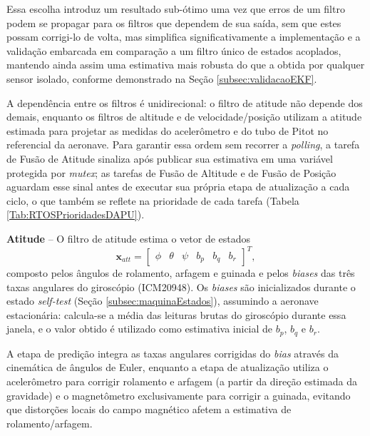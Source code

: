 Essa escolha introduz um resultado sub-ótimo uma vez que erros de um filtro podem se propagar para os filtros que dependem de sua saída, sem que estes possam corrigi-lo de volta, mas simplifica significativamente a implementação e a validação embarcada em comparação a um filtro único de estados acoplados, mantendo ainda assim uma estimativa mais robusta do que a obtida por qualquer sensor isolado, conforme demonstrado na Seção \ref{subsec:validacaoEKF}.

A dependência entre os filtros é unidirecional: o filtro de atitude não depende dos demais, enquanto os filtros de altitude e de velocidade/posição utilizam a atitude estimada para projetar as medidas do acelerômetro e do tubo de Pitot no referencial da aeronave. Para garantir essa ordem sem recorrer a \textit{polling}, a tarefa de Fusão de Atitude sinaliza após publicar sua estimativa em uma variável protegida por \textit{mutex}; as tarefas de Fusão de Altitude e de Fusão de Posição aguardam esse sinal antes de executar sua própria etapa de atualização a cada ciclo, o que também se reflete na prioridade de cada tarefa (Tabela \ref{Tab:RTOSPrioridadesDAPU}).

\textbf{Atitude} -- O filtro de atitude estima o vetor de estados
\begin{equation}
    \mathbf{x}_{att} = \begin{bmatrix} \phi & \theta & \psi & b_p & b_q & b_r \end{bmatrix}^T,
\end{equation}
composto pelos ângulos de rolamento, arfagem e guinada e pelos \textit{biases} das três taxas angulares do giroscópio (ICM20948). Os \textit{biases} são inicializados durante o estado \textit{self-test} (Seção \ref{subsec:maquinaEstados}), assumindo a aeronave estacionária: calcula-se a média das leituras brutas do giroscópio durante essa janela, e o valor obtido é utilizado como estimativa inicial de $b_p$, $b_q$ e $b_r$.

A etapa de predição integra as taxas angulares corrigidas do \textit{bias} através da cinemática de ângulos de Euler, enquanto a etapa de atualização utiliza o acelerômetro para corrigir rolamento e arfagem (a partir da direção estimada da gravidade) e o magnetômetro exclusivamente para corrigir a guinada, evitando que distorções locais do campo magnético afetem a estimativa de rolamento/arfagem.


